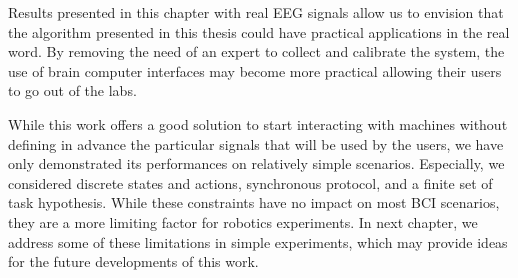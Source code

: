 
\transition

Results presented in this chapter with real EEG signals allow us to envision that the algorithm presented in this thesis could have practical applications in the real word. By removing the need of an expert to collect and calibrate the system, the use of brain computer interfaces may become more practical allowing their users to go out of the labs.

While this work offers a good solution to start interacting with machines without defining in advance the particular signals that will be used by the users, we have only demonstrated its performances on relatively simple scenarios. Especially, we considered discrete states and actions, synchronous protocol, and a finite set of task hypothesis. While these constraints have no impact on most BCI scenarios, they are a more limiting factor for robotics experiments. In next chapter, we address some of these limitations in simple experiments, which may provide ideas for the future developments of this work.














